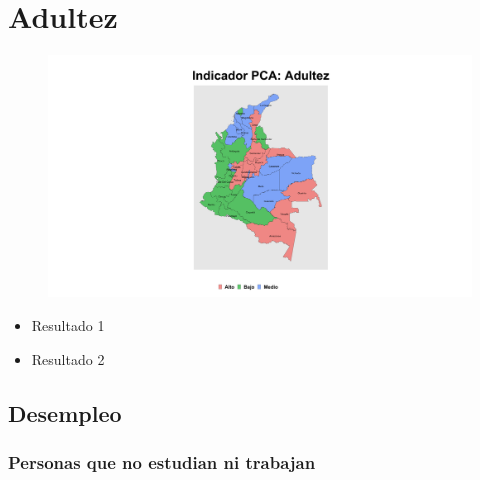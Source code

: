 \section{Adultez}

\begin{figure}[H]
        \caption[Indicador Pulso Social sobre Adultez]{\label{pca_pobreza} }
        \begin{center}
        \includegraphics[width=\textwidth,keepaspectratio]{pca_clusters/pca_adultez_pca.png}
        \end{center}
    \end{figure}
    
    
    \begin{tcolorbox}[enhanced, colback=mycolor,colframe=mycolor,drop fuzzy shadow,watermark color=white,
                        title=Principales Resultados]
    
            \begin{itemize}
                    \item Resultado 1 
                    \item Resultado 2
            \end{itemize}
     
    \end{tcolorbox}
    
    
    \subsection{Desempleo}
        \subsubsection{Personas que no estudian ni trabajan}

